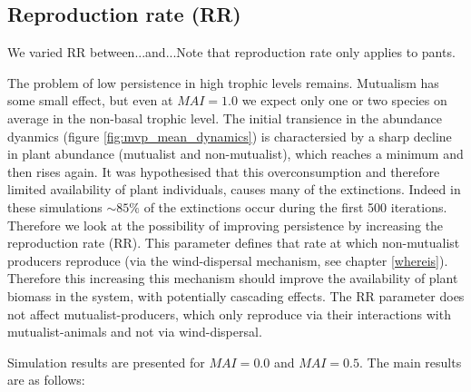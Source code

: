 
\newpage
\subsection{Reproduction rate (RR)}
\label{sec:rr_v_p}

We varied RR between...and...Note that reproduction rate only applies to pants.

The problem of low persistence in high trophic levels remains. Mutualism has some small effect, but even at $MAI = 1.0$ we expect only one or two species on average in the non-basal trophic level. The initial transience in the abundance dyanmics (figure \ref{fig:mvp_mean_dynamics}) is charactersied by a sharp decline in plant abundance (mutualist and non-mutualist), which reaches a minimum and then rises again. It was hypothesised that this overconsumption and therefore limited availability of plant individuals, causes many of the extinctions. Indeed in these simulations $\sim 85\%$ of the extinctions occur during the first 500 iterations. Therefore we look at the possibility of improving persistence by increasing the reproduction rate (RR). This parameter defines that rate at which non-mutualist producers reproduce (via the wind-dispersal mechanism, see chapter \ref{whereis}). Therefore this increasing this mechanism should improve the availability of plant biomass in the system, with potentially cascading effects. The RR parameter does not affect mutualist-producers, which only reproduce via their interactions with mutualist-animals and not via wind-dispersal.

Simulation results are presented for $MAI=0.0$ and $MAI=0.5$. The main results are as follows:

